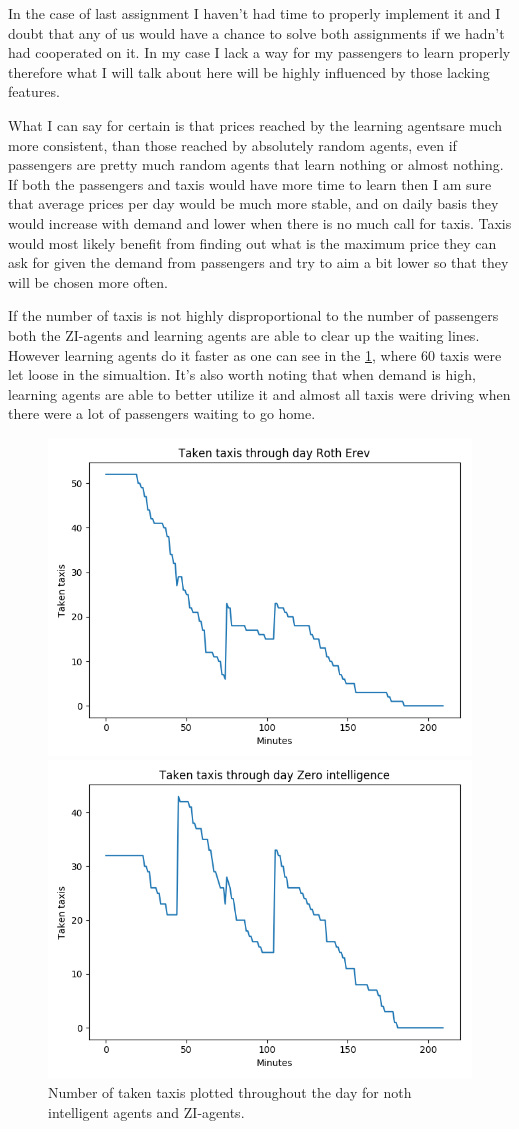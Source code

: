 \documentclass[conference]{IEEEtran}
\begin{document}
In the case of last assignment I haven't had time to properly implement it and I doubt that any of us would have a chance to solve both assignments if we hadn't had cooperated on it. In my case I lack a way for my passengers to learn properly therefore what I will talk about here will be highly influenced by those lacking features. 

What I can say for certain is that prices reached by the learning agentsare much more consistent, than those reached by absolutely random agents, even if passengers are pretty much random agents that learn nothing or almost nothing. If both the passengers and taxis would have more time to learn then I am sure that average prices per day would be much more stable, and on daily basis they would increase with demand and lower when there is no much call for taxis. Taxis would most likely benefit from finding out what is the maximum price they can ask for given the demand from passengers and try to aim a bit lower so that they will be chosen more often.

If the number of taxis is not highly disproportional to the number of passengers both the ZI-agents and learning agents are able to clear up the waiting lines. However learning agents do it faster as one can see in the \cref{fig:TakenTaxis}, where 60 taxis were let loose in the simualtion. It's also worth noting that when demand is high, learning agents are able to better utilize it and almost all taxis were driving when there were a lot of passengers waiting to go home.

\begin{figure}[htbp]
  \centerline{\includegraphics[width=.4\textwidth]{Taken_Taxis_Roth_Erev}}
  \centerline{\includegraphics[width=.4\textwidth]{Taken_Taxis_Zero_Int}}
  \caption{Number of taken taxis plotted throughout the day for noth intelligent agents and ZI-agents.}
  \label{fig:TakenTaxis}
\end{figure}
\end{document}
